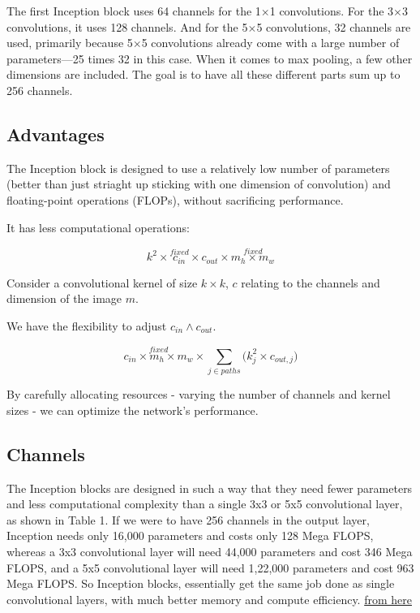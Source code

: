 \documentclass[11pt]{article}
\begin{document}
The first Inception block uses 64 channels for the 1$\times$1 convolutions. For the 3$\times$3 convolutions, it uses 128 channels. And for the 5$\times$5 convolutions, 32 channels are used, primarily because 5$\times$5 convolutions already come with a large number of parameters—25 times 32 in this case. When it comes to max pooling, a few other dimensions are included. The goal is to have all these different parts sum up to 256 channels. 

\subsection{Advantages}

The Inception block is designed to use a relatively low number of parameters (better than just striaght up sticking with one dimension of convolution) and floating-point operations (FLOPs), without sacrificing performance.

It has less computational operations:

\begin{equation*}
    k^2 \times \stackrel{fixed}{\boxed{c_{in}}} \times c_{out} \times \stackrel{fixed}{\boxed{m_h \times m_w}}
\end{equation*}

Consider a convolutional kernel of size $k\times k$, $c$ relating to the channels and dimension of the image $m$. 

We have the flexibility to adjust $c_{in} \wedge c_{out}$.

\begin{equation*}
    \stackrel{fixed}{\boxed{c_{in} \times m_h \times m_w}} \times \sum_{j \in paths}\bigl(k^2_j \times c_{out,j}\bigr)
\end{equation*}

By carefully allocating resources - varying the number of channels and kernel sizes - we can optimize the network's performance.

\subsection{Channels}

The Inception blocks are designed in such a way that they need fewer parameters and less computational complexity than a single 3x3 or 5x5 convolutional layer, as shown in Table 1. If we were to have 256 channels in the output layer, Inception needs only 16,000 parameters and costs only 128 Mega FLOPS, whereas a 3x3 convolutional layer will need 44,000 parameters and cost 346 Mega FLOPS, and a 5x5 convolutional layer will need 1,22,000 parameters and cost 963 Mega FLOPS. So Inception blocks, essentially get the same job done as single convolutional layers, with much better memory and compute efficiency. \href{https://medium.com/swlh/understanding-inception-simplifying-the-network-architecture-54cd31d38949}{from here}
\end{document}
